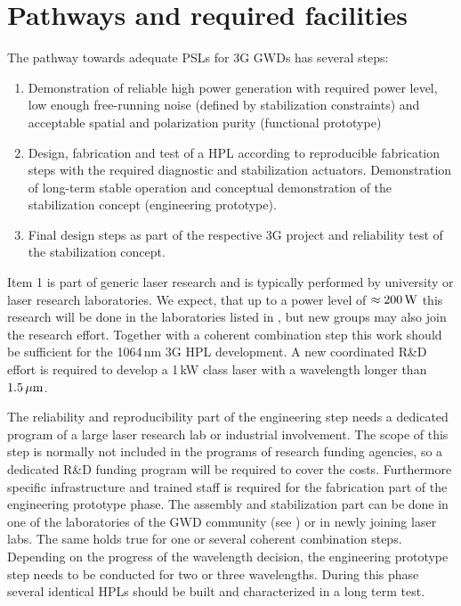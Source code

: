 \section{Pathways and required facilities} \label{sec:pathway}
The pathway towards adequate PSLs for 3G GWDs has several steps:
\begin{enumerate}
	\item Demonstration of reliable high power generation with required power level, low enough free-running noise (defined by stabilization constraints) and acceptable spatial and polarization purity (functional prototype)
	\item Design, fabrication and test of a HPL according to reproducible fabrication steps with the required diagnostic and stabilization actuators. Demonstration of long-term stable operation and conceptual demonstration of the stabilization concept (engineering prototype).
	\item Final design steps as part of the respective 3G project and reliability test of the stabilization concept.
\end{enumerate}

\noindent Item 1 is part of generic laser research and is typically performed by university or laser research laboratories. We expect, that up to a power level of $ \approx 200 \, {\rm W} $ this research will be done in the laboratories listed in \cite{LightSource_RD_table}, but new groups may also join the research effort. Together with a coherent combination step this work should be sufficient for the 1064\,nm 3G HPL development.
A new coordinated R\&D effort is required to develop a 1\,kW class laser with a wavelength longer than $ 1.5\, {\rm \mu m}$.

The reliability and reproducibility part of the engineering step needs a dedicated program of a large laser research lab or industrial involvement. The scope of this step is normally not included in the programs of research funding agencies, so a dedicated R\&D funding program will be required to cover the costs.
Furthermore specific infrastructure and trained staff is required for the fabrication part of the engineering prototype phase. The assembly and stabilization part can be done in one of the laboratories of the GWD community (see \cite{LightSource_RD_table}) or in newly joining laser labs. The same holds true for one or several coherent combination steps. Depending on the progress of the wavelength decision, the engineering prototype step needs to be conducted for two or three wavelengths. During this phase several identical HPLs should be built and characterized in a long term test.


